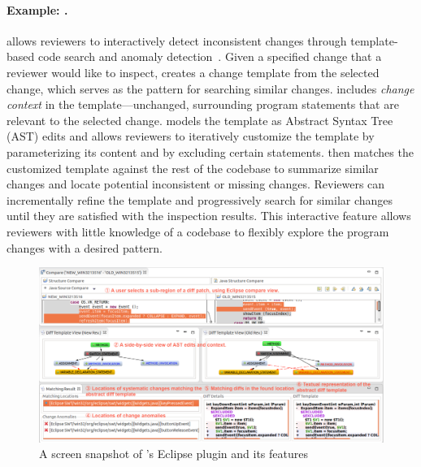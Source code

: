 

\paragraph{Example: {\critics}.} {\critics} allows reviewers to interactively detect inconsistent changes through template-based code search and anomaly detection~\cite{zhang2015interactive}. Given a specified change that a reviewer would like to inspect, {\critics} creates a change template from the selected change, which serves as the pattern for searching similar changes. {\critics} includes {\em change context} in the template---unchanged, surrounding program statements that are relevant to the selected change. {\critics} models the template as Abstract Syntax Tree (AST) edits and allows reviewers to iteratively customize the template by parameterizing its content and by excluding certain statements. {\critics} then matches the customized template against the rest of the codebase to summarize similar changes and locate potential inconsistent or missing changes. Reviewers can incrementally refine the template and progressively search for similar changes until they are satisfied with the inspection results. This interactive feature allows reviewers with little knowledge of a codebase to flexibly explore the program changes with a desired pattern. %

\begin{figure}[ht]
 \centering
 \includegraphics[width=\textwidth]{images/critics-UI2.pdf}
 \caption{A screen snapshot of {\critics}'s Eclipse plugin and its features}
 \label{fig:critics-UI}
\end{figure}

